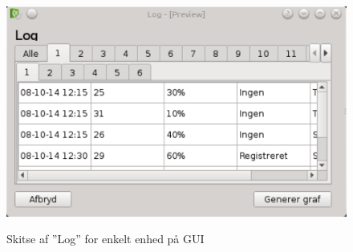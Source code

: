 \begin{figure}[htbp] \centering
{\includegraphics[scale=0.5]{filer/pics/GUI/Log-enhed}}
\caption{Skitse af ''Log'' for enkelt enhed på GUI}
\label{fig:GUI-log-enhed}
\end{figure}



